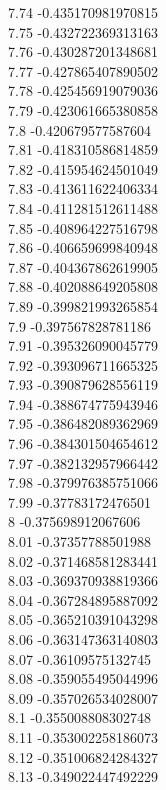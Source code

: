 {7.74	-0.435170981970815\\
7.75	-0.432722369313163\\
7.76	-0.430287201348681\\
7.77	-0.427865407890502\\
7.78	-0.425456919079036\\
7.79	-0.423061665380858\\
7.8	-0.420679577587604\\
7.81	-0.418310586814859\\
7.82	-0.415954624501049\\
7.83	-0.413611622406334\\
7.84	-0.411281512611488\\
7.85	-0.408964227516798\\
7.86	-0.406659699840948\\
7.87	-0.404367862619905\\
7.88	-0.402088649205808\\
7.89	-0.399821993265854\\
7.9	-0.397567828781186\\
7.91	-0.395326090045779\\
7.92	-0.393096711665325\\
7.93	-0.390879628556119\\
7.94	-0.388674775943946\\
7.95	-0.386482089362969\\
7.96	-0.384301504654612\\
7.97	-0.382132957966442\\
7.98	-0.379976385751066\\
7.99	-0.37783172476501\\
8	-0.375698912067606\\
8.01	-0.37357788501988\\
8.02	-0.371468581283441\\
8.03	-0.369370938819366\\
8.04	-0.367284895887092\\
8.05	-0.365210391043298\\
8.06	-0.363147363140803\\
8.07	-0.36109575132745\\
8.08	-0.359055495044996\\
8.09	-0.357026534028007\\
8.1	-0.355008808302748\\
8.11	-0.353002258186073\\
8.12	-0.351006824284327\\
8.13	-0.349022447492229\\
}
